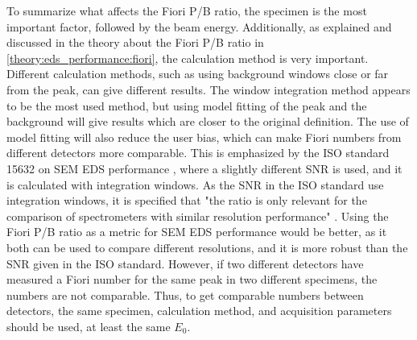 To summarize what affects the Fiori P/B ratio, the specimen is the most important factor, followed by the beam energy.
Additionally, as explained and discussed in the theory about the Fiori P/B ratio in \cref{theory:eds_performance:fiori}, the calculation method is very important.
Different calculation methods, such as using background windows close or far from the peak, can give different results.
The window integration method appears to be the most used method, but using model fitting of the peak and the background will give results which are closer to the original definition.
The use of model fitting will also reduce the user bias, which can make Fiori numbers from different detectors more comparable.
This is emphasized by the ISO standard 15632 on SEM EDS performance \cite{iso_qc_15632}, where a slightly different SNR is used, and it is calculated with integration windows.
As the SNR in the ISO standard use integration windows, it is specified that "the ratio is only relevant for the comparison of spectrometers with similar resolution performance" \cite[p. 4]{iso_qc_15632}.
Using the Fiori P/B ratio as a metric for SEM EDS performance would be better, as it both can be used to compare different resolutions, and it is more robust than the SNR given in the ISO standard.
However, if two different detectors have measured a Fiori number for the same peak in two different specimens, the numbers are not comparable.
Thus, to get comparable numbers between detectors, the same specimen, calculation method, and acquisition parameters should be used, at least the same $E_0$.



